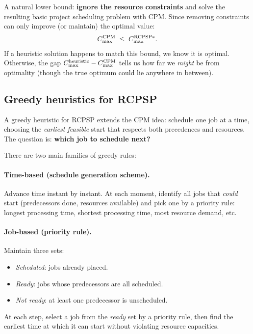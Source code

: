 A natural lower bound: \textbf{ignore the resource constraints}
and solve the resulting basic project scheduling problem with CPM\@.
Since removing constraints can only improve (or maintain) the
optimal value:
\[
  C_{\max}^{\text{CPM}} \;\le\; C_{\max}^{\text{RCPSP}*}.
\]
If a heuristic solution happens to match this bound, we know it
is optimal.  Otherwise, the gap
$C_{\max}^{\text{heuristic}} - C_{\max}^{\text{CPM}}$
tells us how far we \emph{might} be from optimality (though the
true optimum could lie anywhere in between).

\subsection{Greedy heuristics for RCPSP}
\label{ssec:rcpsp-greedy}

A greedy heuristic for RCPSP extends the CPM idea:
schedule one job at a time, choosing the \emph{earliest feasible}
start that respects both precedences and resources.
The question is: \textbf{which job to schedule next?}

There are two main families of greedy rules:

\paragraph{Time-based (schedule generation scheme).}
Advance time instant by instant.  At each moment, identify all
jobs that \emph{could} start (predecessors done, resources
available) and pick one by a priority rule:
longest processing time, shortest processing time, most resource
demand, etc.

\paragraph{Job-based (priority rule).}
Maintain three sets:
\begin{itemize}[nosep]
  \item \emph{Scheduled}: jobs already placed.
  \item \emph{Ready}: jobs whose predecessors are all scheduled.
  \item \emph{Not ready}: at least one predecessor is unscheduled.
\end{itemize}
At each step, select a job from the \emph{ready} set by a
priority rule, then find the earliest time at which it can start
without violating resource capacities.

